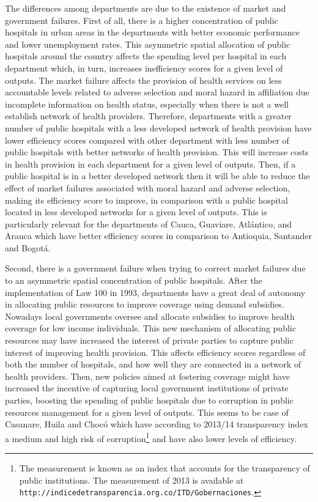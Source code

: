 \documentclass[11pt,a4paper,oneside]{article}
\begin{document}


The differences among departments are due to the existence of market and government failures. First of all, there is a higher concentration of public hospitals in urban areas in the departments with better economic performance and lower unemployment rates. This asymmetric spatial allocation of public hospitals around the country affects the spending level per hospital in each department which, in turn, increases inefficiency scores for a given level of outputs. The market failure affects the provision of health services on less accountable levels related to adverse selection and moral hazard in affiliation due incomplete information on health status, especially when there is not a well establish network of health providers. Therefore, departments with a greater number of public hospitals with a less developed network of health provision have lower efficiency scores compared with other department with less number of public hospitals with better networks of health provision. This will increase costs in health provision in each department for a given level of outputs. Then, if a public hospital is in a better developed network then it will be able to reduce the effect of market failures associated with moral hazard and adverse selection, making its efficiency score to improve, in comparison with a public hospital located in less developed networks for a given level of outputs. This is particularly relevant for the departments of Cauca, Guaviare, Atl\'antico, and Arauca which have better efficiency scores in comparison to Antioquia, Santander and Bogot\'a. 


Second, there is a government failure when trying to correct market failures due to an asymmetric spatial concentration of public hospitals. After the implementation of Law 100 in 1993, departments have a great deal of autonomy in allocating public resources to improve coverage using demand subsidies. Nowadays local governments oversee and allocate subsidies to improve health coverage for low income individuals.  This new mechanism of allocating public resources may have increased the interest of private parties to capture public interest of improving health provision. This affects efficiency scores regardless of both the number of hospitals, and how well they are connected in a network of health providers. Then, new policies aimed at fostering coverage might have increased the incentive of capturing local government institutions of private parties, boosting the spending of public hospitals due to corruption in public resources management for a given level of outputs. This seems to be case of Casanare, Huila and Choc\'o which have according to 2013/14 transparency index a medium and high risk of corruption\footnote{The measurement is known as an index that accounts for the transparency of public institutions. The measurement of 2013 is available at \texttt{http://indicedetransparencia.org.co/ITD/Gobernaciones}.} and have also lower levels of efficiency. 
\end{document}
